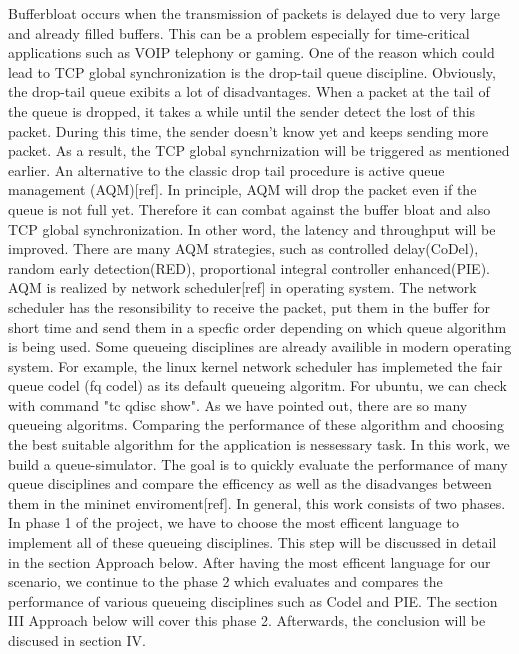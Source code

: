 Bufferbloat occurs when the transmission of packets is delayed due to very large and already filled buffers. This can be a problem especially for time-critical applications such as VOIP telephony or gaming.\newline
One of the reason which could lead to TCP global synchronization is the drop-tail queue discipline. Obviously, the drop-tail queue exibits a lot of disadvantages. When a packet at the tail of the queue is dropped, it takes a while until the sender detect the lost of this packet. During this time, the sender doesn't know yet and keeps sending more packet. As a result, the TCP global synchrnization will be triggered as mentioned earlier. An alternative to the classic drop tail procedure is active queue management (AQM)[ref]. In principle, AQM will drop the packet even if the queue is not full yet. Therefore it can combat against the buffer bloat and also TCP global synchronization. In other word, the latency and throughput will be improved. There are many AQM strategies, such as controlled delay(CoDel), random early detection(RED), proportional integral controller enhanced(PIE). AQM is realized by network scheduler[ref] in operating system. The network scheduler has the resonsibility to receive the packet, put them in the buffer for short time and send them in a specfic order depending on which queue algorithm is being used. Some queueing disciplines are already availible in modern operating system. For example, the linux kernel network scheduler has implemeted the fair queue codel (fq codel) as its default queueing algoritm. For ubuntu, we can check with command "tc qdisc show".\newline 
As we have pointed out, there are so many queueing algoritms. Comparing the performance of these algorithm and choosing the best suitable algorithm for the application is nessessary task. In this work, we build a queue-simulator. The goal is to quickly evaluate the performance of many queue disciplines and compare the efficency as well as the disadvanges between them in the mininet enviroment[ref]. In general, this work consists of two phases. In phase 1 of the project, we have to choose the most efficent language to implement all of these queueing disciplines. This step will be discussed in detail in the section Approach below. After having the most efficent language for our scenario, we continue to the phase 2 which evaluates and compares the performance of various queueing disciplines such as Codel and PIE. The section III Approach below will cover this phase 2. Afterwards, the conclusion will be discused in section IV. \newline 


 


